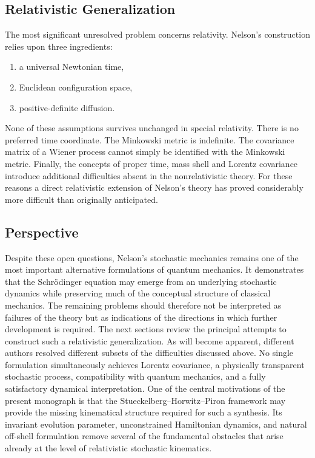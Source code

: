 \subsection{Relativistic Generalization}
The most significant unresolved problem concerns relativity.
Nelson's construction relies upon three ingredients:
\begin{enumerate}
\item
a universal Newtonian time,
\item
Euclidean configuration space,
\item
positive-definite diffusion.
\end{enumerate}
None of these assumptions survives unchanged in special relativity.
There is no preferred time coordinate.
The Minkowski metric is indefinite.
The covariance matrix of a Wiener process cannot simply be identified
with the Minkowski metric.
Finally, the concepts of proper time, mass shell and Lorentz covariance
introduce additional difficulties absent in the nonrelativistic theory.
For these reasons a direct relativistic extension of Nelson's theory has
proved considerably more difficult than originally anticipated.
\subsection{Perspective}
Despite these open questions, Nelson's stochastic mechanics remains one
of the most important alternative formulations of quantum mechanics.
It demonstrates that the Schrödinger equation may emerge from an
underlying stochastic dynamics while preserving much of the conceptual
structure of classical mechanics.
The remaining problems should therefore not be interpreted as failures
of the theory but as indications of the directions in which further
development is required.
The next sections review the principal attempts to construct such a
relativistic generalization. As will become apparent, different authors
resolved different subsets of the difficulties discussed above. No
single formulation simultaneously achieves Lorentz covariance, a
physically transparent stochastic process, compatibility with quantum
mechanics, and a fully satisfactory dynamical interpretation.
One of the central motivations of the present monograph is that the
Stueckelberg--Horwitz--Piron framework may provide the missing
kinematical structure required for such a synthesis. Its invariant
evolution parameter, unconstrained Hamiltonian dynamics, and natural
off-shell formulation remove several of the fundamental obstacles that
arise already at the level of relativistic stochastic kinematics.
